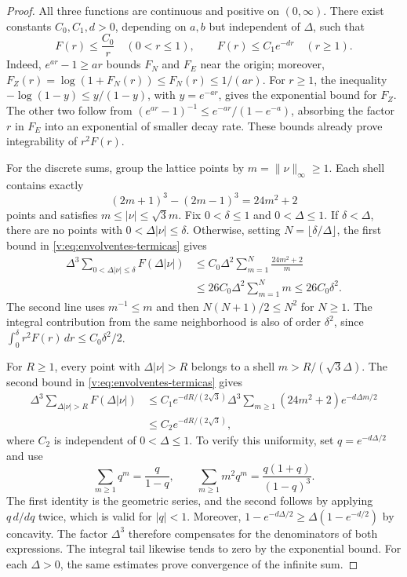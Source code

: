 \begin{proof}
All three functions are continuous and positive on \((0,\infty)\).
There exist constants \(C_0,C_1,d>0\), depending on \(a,b\) but
independent of \(\Delta\), such that
\begin{equation}
 F(r)\leq\frac{C_0}{r}\quad(0<r\leq1),\qquad
 F(r)\leq C_1e^{-dr}\quad(r\geq1).
 \label{v:eq:envolventes-termicas}
\end{equation}
Indeed, \(e^{ar}-1\geq ar\) bounds \(F_N\) and \(F_E\)
near the origin; moreover,
\(F_Z(r)=\log(1+F_N(r))\leq F_N(r)\leq1/(ar)\).
For \(r\geq1\), the inequality
\(-\log(1-y)\leq y/(1-y)\), with \(y=e^{-ar}\), gives the
exponential bound for \(F_Z\). The other two follow from
\((e^{ar}-1)^{-1}\leq e^{-ar}/(1-e^{-a})\), absorbing the
factor \(r\) in \(F_E\) into an exponential of smaller decay rate. These bounds
already prove integrability of \(r^2F(r)\).

For the discrete sums, group the lattice points by
\(m=\|\nu\|_\infty\geq1\). Each shell contains exactly
\[
 (2m+1)^3-(2m-1)^3=24m^2+2
\]
points and satisfies \(m\leq|\nu|\leq\sqrt3m\).
Fix \(0<\delta\leq1\) and \(0<\Delta\leq1\).
If \(\delta<\Delta\), there are no points with
\(0<\Delta|\nu|\leq\delta\). Otherwise, setting
\(N=\lfloor\delta/\Delta\rfloor\), the first bound in
\eqref{v:eq:envolventes-termicas} gives
\begin{align*}
 \Delta^3\!\sum_{0<\Delta|\nu|\leq\delta}F(\Delta|\nu|)
 &\leq C_0\Delta^2\sum_{m=1}^{N}\frac{24m^2+2}{m}\\
 &\leq26C_0\Delta^2\sum_{m=1}^{N}m
 \leq26C_0\delta^2.
\end{align*}
The second line uses \(m^{-1}\leq m\) and then
\(N(N+1)/2\leq N^2\) for \(N\geq1\).
The integral contribution from the same neighborhood is also of order
\(\delta^2\), since
\(\int_0^\delta r^2F(r)\,dr\leq C_0\delta^2/2\).

For \(R\geq1\), every point with \(\Delta|\nu|>R\) belongs
to a shell \(m>R/(\sqrt3\Delta)\). The second bound in
\eqref{v:eq:envolventes-termicas} gives
\begin{align*}
 \Delta^3\!\sum_{\Delta|\nu|>R}F(\Delta|\nu|)
 &\leq C_1e^{-dR/(2\sqrt3)}
 \Delta^3\sum_{m\geq1}(24m^2+2)e^{-d\Delta m/2}\\
 &\leq C_2e^{-dR/(2\sqrt3)},
\end{align*}
where \(C_2\) is independent of \(0<\Delta\leq1\). To verify
this uniformity, set \(q=e^{-d\Delta/2}\) and use
\[
 \sum_{m\geq1}q^m=\frac{q}{1-q},\qquad
 \sum_{m\geq1}m^2q^m=\frac{q(1+q)}{(1-q)^3}.
\]
The first identity is the geometric series, and the second follows by
applying \(q\,d/dq\) twice, which is valid for \(|q|<1\).
Moreover,
\(1-e^{-d\Delta/2}\geq\Delta(1-e^{-d/2})\) by concavity.
The factor \(\Delta^3\) therefore compensates for the denominators of
both expressions. The integral tail likewise tends to zero by the
exponential bound. For each \(\Delta>0\), the same estimates
prove convergence of the infinite sum.


\end{proof}

